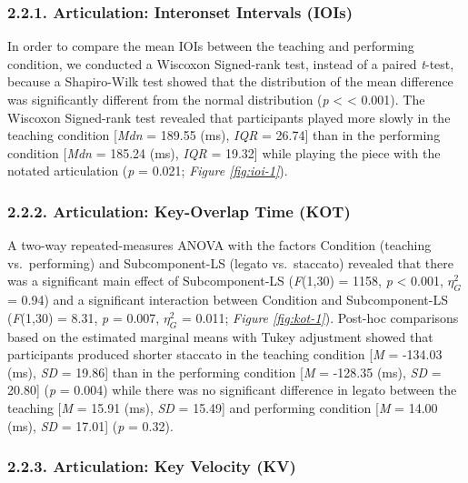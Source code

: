 \documentclass[
  english,
  man,floatsintext]{apa6}
\begin{document}
\hypertarget{articulation-interonset-intervals-iois}{%
\subsubsection{2.2.1. Articulation: Interonset Intervals (IOIs)}\label{articulation-interonset-intervals-iois}}

In order to compare the mean IOIs between the teaching and performing condition, we conducted a Wiscoxon Signed-rank test, instead of a paired \emph{t}-test, because a Shapiro-Wilk test showed that the distribution of the mean difference was significantly different from the normal distribution (\emph{p} \textless{} \textless{} 0.001). The Wiscoxon Signed-rank test revealed that participants played more slowly in the teaching condition {[}\emph{Mdn} = 189.55 (ms), \emph{IQR} = 26.74{]} than in the performing condition {[}\emph{Mdn} = 185.24 (ms), \emph{IQR} = 19.32{]} while playing the piece with the notated articulation (\emph{p} = 0.021; \emph{Figure \ref{fig:ioi-1}}).

\hypertarget{articulation-key-overlap-time-kot}{%
\subsubsection{2.2.2. Articulation: Key-Overlap Time (KOT)}\label{articulation-key-overlap-time-kot}}

A two-way repeated-measures ANOVA with the factors Condition (teaching vs.~performing) and Subcomponent-LS (legato vs.~staccato) revealed that there was a significant main effect of Subcomponent-LS (\emph{F}(1,30) = 1158, \emph{p} \textless{} 0.001, \(\eta_G^2\) = 0.94) and a significant interaction between Condition and Subcomponent-LS (\emph{F}(1,30) = 8.31, \emph{p} = 0.007, \(\eta_G^2\) = 0.011; \emph{Figure \ref{fig:kot-1}}). Post-hoc comparisons based on the estimated marginal means with Tukey adjustment showed that participants produced shorter staccato in the teaching condition {[}\emph{M} = -134.03 (ms), \emph{SD} = 19.86{]} than in the performing condition {[}\emph{M} = -128.35 (ms), \emph{SD} = 20.80{]} (\emph{p} = 0.004) while there was no significant difference in legato between the teaching {[}\emph{M} = 15.91 (ms), \emph{SD} = 15.49{]} and performing condition {[}\emph{M} = 14.00 (ms), \emph{SD} = 17.01{]} (\emph{p} = 0.32).

\hypertarget{articulation-key-velocity-kv}{%
\subsubsection{2.2.3. Articulation: Key Velocity (KV)}\label{articulation-key-velocity-kv}}
\end{document}
